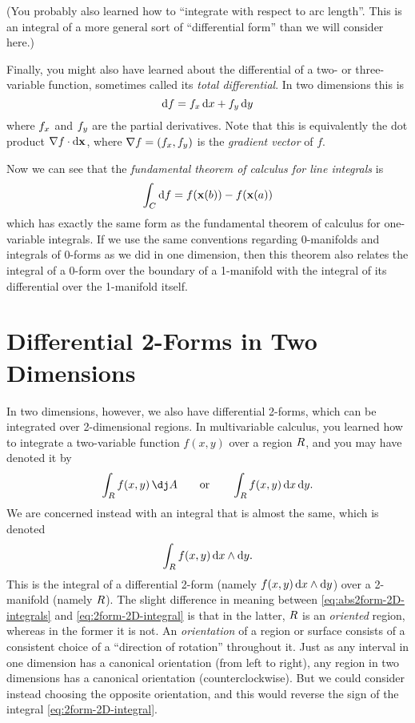 \documentclass[12pt]{amsart}
\begin{document}
(You probably also learned how to ``integrate with respect to arc length''.
This is an integral of a more general sort of ``differential form'' than we will consider here.)

Finally, you might also have learned about the differential of a two- or three-variable function, sometimes called its \emph{total differential}.
In two dimensions this is
\begin{equation}
  {\ensuremath{\mathrm{d} f}} = {f}_{x} \,{\mathrm{d} x} + {f}_{y} \,{\mathrm{d} y}\label{eq:differential-of-a-0form-in-2D}
\end{equation}
where ${f}_{x}$ and ${f}_{y}$ are the partial derivatives.
Note that this is equivalently the dot product $\nabla f \cdot {\ensuremath{\mathrm{d} \mathbf{x}}}$, where $\nabla f = ({f}_{x},{f}_{y})$ is the \emph{gradient vector} of $f$.

Now we can see that the \emph{fundamental theorem of calculus for line integrals} is
\[ \int_{C} {\mathrm{d} f} = f(\mathbf{x}(b)) - f(\mathbf{x}(a)) \]
which has exactly the same form as the fundamental theorem of calculus for one-variable integrals.
If we use the same conventions regarding 0-manifolds and integrals of 0-forms as we did in one dimension, then this theorem also relates the integral of a 0-form over the boundary of a 1-manifold with the integral of its differential over the 1-manifold itself.

\section{Differential 2-Forms in Two Dimensions}
\label{sec:2forms-in-2D}

In two dimensions, however, we also have differential 2-forms, which can be integrated over 2-dimensional regions.
In multivariable calculus, you learned how to integrate a two-variable function $f(x,y)$ over a region $R$, and you may have denoted it by
\begin{equation}
  \int_\region f(x,y)\,\dA \qquad\text{or}\qquad \int_\region f(x,y)\,\dx\,\dy.\label{eq:abs2form-2D-integrals}
\end{equation}
We are concerned instead with an integral that is almost the same, which is denoted
\begin{equation}
  \int_R f(x,y) \,{\mathrm{d} x}\wedge {\ensuremath{\mathrm{d} y}}.\label{eq:2form-2D-integral}
\end{equation}
This is the integral of a differential 2-form (namely $f(x,y) \,{\mathrm{d} x}\wedge {\ensuremath{\mathrm{d} y}}$) over a 2-manifold (namely $R$).
The slight difference in meaning between \cref{eq:abs2form-2D-integrals} and \cref{eq:2form-2D-integral} is that in the latter, $R$ is an \emph{oriented} region, whereas in the former it is not.
An \emph{orientation} of a region or surface consists of a consistent choice of a ``direction of rotation'' throughout it.
Just as any interval in one dimension has a canonical orientation (from left to right), any region in two dimensions has a canonical orientation (counterclockwise).
But we could consider instead choosing the opposite orientation, and this would reverse the sign of the integral \cref{eq:2form-2D-integral}.
\end{document}
